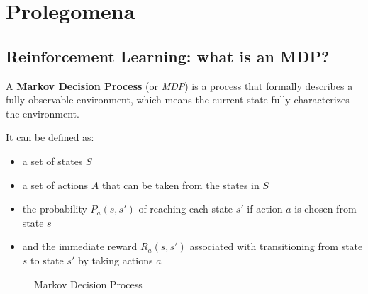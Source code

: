 \chapter{Prolegomena}
\label{chap:prolegomena}

\section{Reinforcement Learning: what is an MDP?}

A \textbf{Markov Decision Process} \cite{mdp} (or \textit{MDP}) is a process that formally describes a fully-observable environment, which means the current state fully characterizes the environment. 

It can be defined as:

\begin{itemize}
    \item a set of states $S$
    \item a set of actions $A$ that can be taken from the states in $S$
    \item the probability $P_a(s, s')$ of reaching each state $s'$ if action $a$ is chosen from state $s$
    \item and the immediate reward $R_a(s, s')$ associated with transitioning from state $s$ to state $s'$ by taking actions $a$
\end{itemize}
      
\begin{figure}[H]
    \centering
  
    \caption{Markov Decision Process}
    \label{fig:my_label}
\end{figure}

